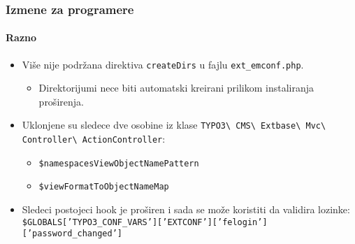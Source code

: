 \begin{frame}[fragile]
	\frametitle{Izmene za programere}
	\framesubtitle{Razno}

	\begin{itemize}
		\item Više nije podržana direktiva \texttt{createDirs} u fajlu \texttt{ext\_emconf.php}.

			\begin{itemize}\smaller
				\item[\ding{228}] Direktorijumi nece biti automatski kreirani prilikom instaliranja proširenja.
			\end{itemize}\normalsize

		\item Uklonjene su sledece dve osobine iz klase
			\texttt{TYPO3\textbackslash
				CMS\textbackslash
				Extbase\textbackslash
				Mvc\textbackslash
				Controller\textbackslash
				ActionController}:\newline

			\begin{itemize}
				\item \texttt{\$namespacesViewObjectNamePattern}
				\item \texttt{\$viewFormatToObjectNameMap}
			\end{itemize}

		\item Sledeci postojeci hook je proširen i sada se može koristiti da validira lozinke:\newline
			{\fontsize{8}{10} \selectfont \texttt{\$GLOBALS['TYPO3\_CONF\_VARS']['EXTCONF']['felogin']['password\_changed']}}

	\end{itemize}

\end{frame}


